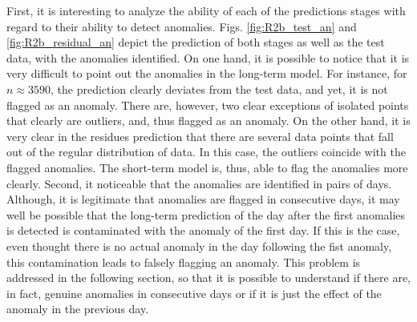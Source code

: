\documentclass[]{scrartcl}
\begin{document}
First, it is interesting to analyze the ability of each of the predictions stages with regard to their ability to detect anomalies. Figs. \ref{fig:R2b_test_an} and \ref{fig:R2b_residual_an} depict the prediction of both stages as well as the test data, with the anomalies identified. On one hand, it is possible to notice that it is very difficult to point out the anomalies in the long-term model. For instance, for $n \approx 3590$, the prediction clearly deviates from the test data, and yet, it is not flagged as an anomaly. There are, however, two clear exceptions of isolated points that clearly are outliers, and, thus flagged as an anomaly. On the other hand, it is very clear in the residues prediction that there are several data points that fall out of the regular distribution of data. In this case, the outliers coincide with the flagged anomalies. The short-term model is, thus, able to flag the anomalies more clearly. Second, it noticeable that the anomalies are identified in pairs of days. Although, it is legitimate that anomalies are flagged in consecutive days, it may well be possible that the long-term prediction of the day after the first anomalies is detected is contaminated with the anomaly of the first day. If this is the case, even thought there is no actual anomaly in the day following the fist anomaly, this contamination leads to falsely flagging an anomaly. This problem is addressed in the following section, so that it is possible to understand if there are, in fact, genuine anomalies in consecutive days or if it is just the effect of the anomaly in the previous day.
\end{document}
